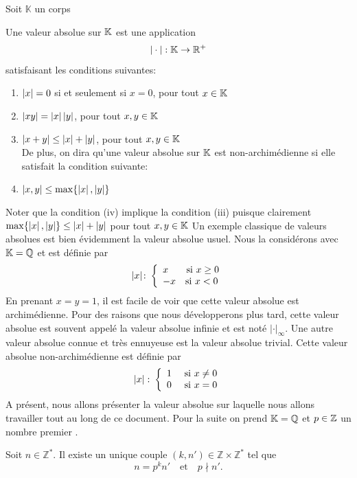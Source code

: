 Soit $\mathbb K$ un corps
\begin{definition}
    Une valeur absolue sur $\mathbb{K}$ est une application
    \[
    |\cdot|:\mathbb{K} \to \mathbb R ^+
    \]
    satisfaisant les conditions suivantes:
    \begin{enumerate}
        \item $\left| x \right|=0$ si et seulement si $x=0$, pour tout $x\in \mathbb{K}$
        \item $\left| xy \right|= \left| x \right|\left| y \right|$, pour tout $x,y\in \mathbb{K}$
        \item $\left| x+y \right|\le \left| x \right|+\left| y \right|$, pour tout $x,y\in \mathbb{K}$\\
        De plus, on dira qu'une valeur absolue sur $\mathbb{K}$ est non-archimédienne si elle satisfait la condition suivante:
        \item $\left| x,y \right|\leq \operatorname{max}\{\left| x \right|,\left| y \right|\}$
    \end{enumerate}
\end{definition}
Noter que la condition (iv) implique la condition (iii) puisque clairement $\operatorname{max}\{\left| x \right|,\left| y \right|\}\leq \left| x \right|+\left| y \right|$ pour tout $x,y\in \mathbb{K}$
Un exemple classique de valeurs absolues est bien évidemment la valeur absolue usuel. Nous la considérons avec $\mathbb{K} = \mathbb{Q}$ et est définie par
\[
|x|\colon \left\{\begin{array}{l}x \quad \; \; \text{ si } x\ge 0 \\-x \quad \text{si }x<0\end{array}\right.
\]
En prenant $x=y=1$, il est facile de voir que cette valeur absolue est archimédienne. Pour des raisons que nous développerons plus tard, cette valeur absolue est souvent appelé la valeur absolue infinie et est noté $|\cdot|_\infty$. Une autre valeur absolue connue et très ennuyeuse est la valeur absolue trivial. Cette valeur absolue non-archimédienne est définie par
\[
\left| x \right|\colon \left\{\begin{array}{l}1 \quad \text{ si }x \neq 0 \\0 \quad \text{ si } x=0 \end{array}\right.
\]
A présent, nous allons présenter la valeur absolue sur laquelle nous allons travailler tout au long de ce document. Pour la suite on prend $\mathbb{K} = \mathbb{Q}$ et $p\in \mathbb{Z}$ un nombre premier .
\begin{proposition}
Soit $n \in \mathbb Z^*$.
Il existe un unique couple $(k,n') \in \mathbb Z \times \mathbb Z^*$ tel que
\[
n = p^k n' \quad \text{et} \quad p \nmid n'.
\]
\end{proposition}

